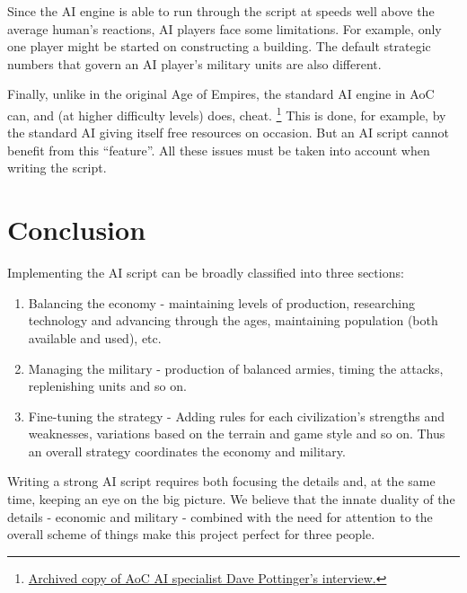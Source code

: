 \documentclass[a4paper,12pt]{article}
\begin{document}
Since the AI engine is able to run through the script at speeds well above 
the average human's reactions, AI players face some limitations. For 
example, only one player might be started on constructing a building. The 
default strategic numbers that govern an AI player's military units are 
also different.

Finally, unlike in the original Age of Empires, the standard AI engine in 
AoC can, and (at higher difficulty levels) does, cheat.
\footnote{\href{http://web.archive.org/web/20081013144438/http://www.microsoft.com/games/empires/behind_dave.htm}
{Archived copy of AoC AI specialist Dave Pottinger's interview.}} 
This is done, for example, by the standard AI giving itself free resources 
on occasion. But an AI script cannot benefit from this ``feature''. All 
these issues must be taken into account when writing the script.

\section*{Conclusion}
Implementing the AI script can be broadly classified into three sections:
\begin{enumerate}
	\item Balancing the economy - maintaining levels of production, 
	researching technology and advancing through the ages, maintaining 
	population (both available and used), etc.
	\item Managing the military - production of balanced armies, timing 
	the attacks, replenishing units and so on.
	\item Fine-tuning the strategy - Adding rules for each civilization's 
	strengths and weaknesses, variations based on the terrain and game 
	style and so on. 
	Thus an overall strategy coordinates the economy and military.
\end{enumerate}

Writing a strong AI script requires both focusing the details and, at the 
same time, keeping an eye on the big picture. We believe that the innate 
duality of the details - economic and military - combined with the need 
for attention to the overall scheme of things make this project perfect 
for three people.
\end{document}
